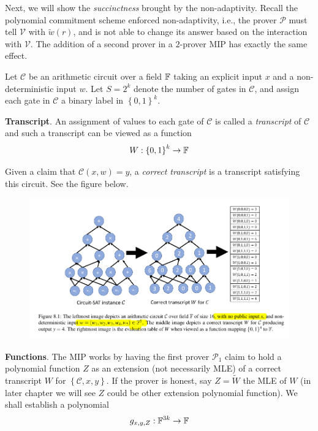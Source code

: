 \documentclass{article}
\begin{document}
Next, we will show the \textit{succinctness} brought by the non-adaptivity. Recall the polynomial commitment scheme enforced non-adaptivity, i.e., the prover $\mathcal{P}$ must tell $\mathcal{V}$ with $\tilde{w}(r)$, and is not able to change its answer based on the interaction with $\mathcal{V}$. The addition of a second prover in a $2$-prover MIP has exactly the same effect. 

Let $\mathcal{C}$ be an arithmetic circuit over a field $\mathbb{F}$ taking an explicit input $x$ and a non-deterministic input $w$. Let $S = 2^k$ denote the number of gates in $\mathcal{C}$, and assign each gate in $\mathcal{C}$ a binary label in $\left\{ 0, 1 \right\}^k$. 

\textbf{Transcript}. An assignment of values to each gate of $\mathcal{C}$ is called a \textit{transcript} of $\mathcal{C}$ and such a transcript can be viewed as a function
\begin{equation*}
W: \left\{ 0, 1 \right\}^k \rightarrow \mathbb{F}
\end{equation*}

Given a claim that $\mathcal{C}(x, w) = y$, a \textit{correct transcript} is a transcript satisfying this circuit. See the figure below. 
\begin{figure}[h] \label{fig:circuit-transcript}
\centering
\includegraphics[scale=0.6]{correct_transcript}
\end{figure}

\textbf{Functions}. The MIP works by having the first prover $\mathcal{P}_1$ claim to hold a polynomial function $Z$ as an extension (not necessarily MLE) of a correct transcript $W$ for $\left\{ \mathcal{C}, x, y \right\}$. If the prover is honest, say $Z = \widetilde{W}$ the MLE of $W$ (in later chapter we will see $Z$ could be other extension polynomial function). We shall establish a polynomial
\begin{equation*}
g_{x, y, Z}: \mathbb{F}^{3k} \rightarrow \mathbb{F}
\end{equation*}
\end{document}
